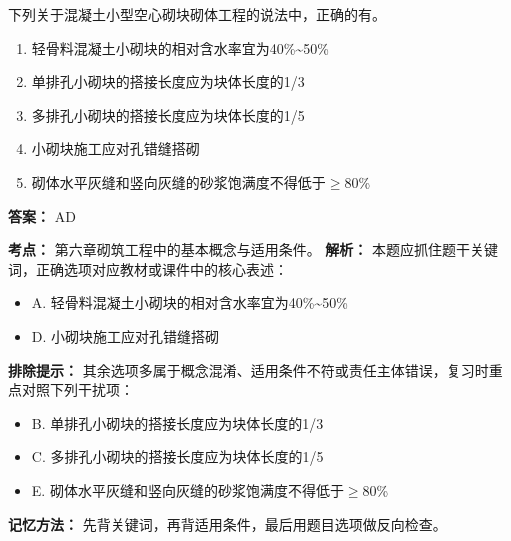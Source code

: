\documentclass[UTF8,fontset=fandol,11pt]{ctexart}
\begin{document}
\begin{quizbox}[title={第 28 题}]
下列关于混凝土小型空心砌块砌体工程的说法中，正确的有。\\
\begin{enumerate}[label=\Alph*.]
\item 轻骨料混凝土小砌块的相对含水率宜为40\%\textasciitilde{}50\%
\item 单排孔小砌块的搭接长度应为块体长度的1/3
\item 多排孔小砌块的搭接长度应为块体长度的1/5
\item 小砌块施工应对孔错缝搭砌
\item 砌体水平灰缝和竖向灰缝的砂浆饱满度不得低于$\geq$80\%
\end{enumerate}
\textbf{答案：} AD
\vspace{0.25em}
\begin{answerbox}[title={考点解析}]
\textbf{考点：} 第六章砌筑工程中的基本概念与适用条件。
\textbf{解析：} 本题应抓住题干关键词，正确选项对应教材或课件中的核心表述：
\begin{itemize}
\item A. 轻骨料混凝土小砌块的相对含水率宜为40\%\textasciitilde{}50\%
\item D. 小砌块施工应对孔错缝搭砌
\end{itemize}
\textbf{排除提示：} 其余选项多属于概念混淆、适用条件不符或责任主体错误，复习时重点对照下列干扰项：
\begin{itemize}
\item B. 单排孔小砌块的搭接长度应为块体长度的1/3
\item C. 多排孔小砌块的搭接长度应为块体长度的1/5
\item E. 砌体水平灰缝和竖向灰缝的砂浆饱满度不得低于$\geq$80\%
\end{itemize}
\textbf{记忆方法：} 先背关键词，再背适用条件，最后用题目选项做反向检查。
\end{answerbox}
\end{quizbox}
\end{document}
